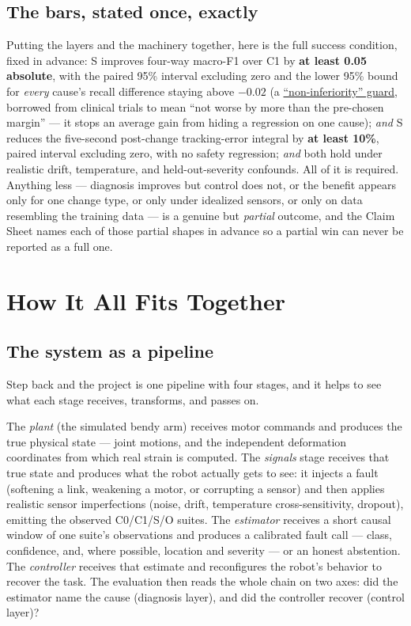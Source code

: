 \documentclass[12pt]{article}
\begin{document}
\subsection{The bars, stated once, exactly}

Putting the layers and the machinery together, here is the full success condition, fixed in advance: S improves four-way macro-F1 over C1 by \textbf{at least 0.05 absolute}, with the paired 95\% interval excluding zero and the lower 95\% bound for \emph{every} cause's recall difference staying above $-0.02$ (a \href{https://www.fda.gov/regulatory-information/search-fda-guidance-documents/non-inferiority-clinical-trials}{``non-inferiority'' guard}, borrowed from clinical trials to mean ``not worse by more than the pre-chosen margin'' --- it stops an average gain from hiding a regression on one cause); \emph{and} S reduces the five-second post-change tracking-error integral by \textbf{at least 10\%}, paired interval excluding zero, with no safety regression; \emph{and} both hold under realistic drift, temperature, and held-out-severity confounds. All of it is required. Anything less --- diagnosis improves but control does not, or the benefit appears only for one change type, or only under idealized sensors, or only on data resembling the training data --- is a genuine but \emph{partial} outcome, and the Claim Sheet names each of those partial shapes in advance so a partial win can never be reported as a full one.

\section{How It All Fits Together}

\subsection{The system as a pipeline}

Step back and the project is one pipeline with four stages, and it helps to see what each stage receives, transforms, and passes on.

The \emph{plant} (the simulated bendy arm) receives motor commands and produces the true physical state --- joint motions, and the independent deformation coordinates from which real strain is computed. The \emph{signals} stage receives that true state and produces what the robot actually gets to see: it injects a fault (softening a link, weakening a motor, or corrupting a sensor) and then applies realistic sensor imperfections (noise, drift, temperature cross-sensitivity, dropout), emitting the observed C0/C1/S/O suites. The \emph{estimator} receives a short causal window of one suite's observations and produces a calibrated fault call --- class, confidence, and, where possible, location and severity --- or an honest abstention. The \emph{controller} receives that estimate and reconfigures the robot's behavior to recover the task. The evaluation then reads the whole chain on two axes: did the estimator name the cause (diagnosis layer), and did the controller recover (control layer)?
\end{document}
